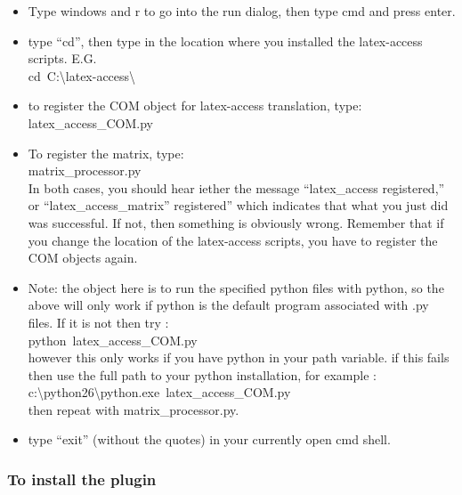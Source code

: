 \documentclass[12pt,a4paper]{report}
\begin{document}
\begin{itemize}
\item Type windows and r to go into the run dialog, then type cmd and press enter.
\item type ``cd'', then type in the location where you installed the latex-access scripts.  E.G.\\
\mbox{cd C:\textbackslash latex-access\textbackslash}
\item to register the COM object for latex-access translation, type:\\
\mbox{latex\_access\_COM.py}
\item To register the matrix, type:\\
\mbox{matrix\_processor.py}\\
  In both cases, you should hear iether the message ``latex\_access
  registered,'' or ``latex\_access\_matrix'' registered'' 
  which indicates that what you just did was successful.  If not,   then something is obviously wrong.  Remember that if you change the location of the latex-access scripts, you have to register the COM objects again.
\item Note: the object here is to run the specified python files with python, so the above will only work if python is the default program associated with .py files.  If it is not then try :\\
\mbox{python latex\_access\_COM.py}\\
however this only works if you have python in your path variable.  if this fails then use the full path to your python installation, for example :\\
\mbox{c:\textbackslash python26\textbackslash python.exe latex\_access\_COM.py}\\
then repeat with matrix\_processor.py.
\item type ``exit'' (without the quotes) in your currently open cmd shell.
\end{itemize}

\subsubsection{To install the plugin}
\end{document}
